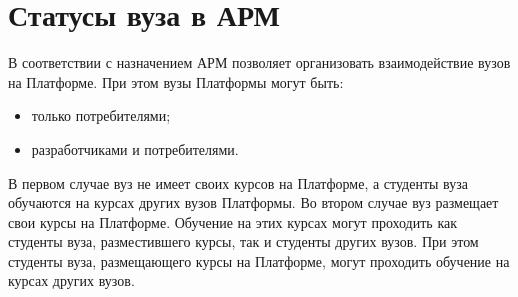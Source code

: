 \section{Статусы вуза в АРМ}
В соответствии с назначением АРМ позволяет организовать взаимодействие вузов на Платформе. При этом вузы Платформы могут быть:
\begin{itemize}
	\item только потребителями;
	\item разработчиками и потребителями.
\end{itemize}
В первом случае вуз не имеет своих курсов на Платформе, а студенты вуза обучаются на курсах других вузов Платформы. Во втором случае вуз размещает свои курсы на Платформе. Обучение на этих курсах могут проходить как студенты вуза, разместившего курсы, так и студенты других вузов. При этом студенты вуза, размещающего курсы на Платформе, могут проходить обучение на курсах других вузов.
